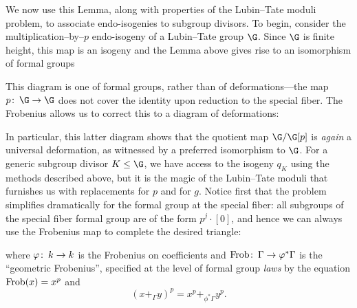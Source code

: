 We now use this Lemma, along with properties of the Lubin--Tate moduli problem, to associate endo-isogenies to subgroup divisors.  To begin, consider the multiplication--by--$p$ endo-isogeny of a Lubin--Tate group $\G$.  Since $\G$ is finite height, this map is an isogeny and the Lemma above gives rise to an isomorphism of formal groups
\begin{center}
\end{center}
This diagram is one of formal groups, rather than of deformations---the map $p\co \G \to \G$ does not cover the identity upon reduction to the special fiber.  The Frobenius allows us to correct this to a diagram of deformations:
\begin{center}
\end{center}
In particular, this latter diagram shows that the quotient map $\G / \G[p]$ is \emph{again} a universal deformation, as witnessed by a preferred isomorphism to $\G$.  For a generic subgroup divisor $K \le \G$, we have access to the isogeny $q_K$ using the methods described above, but it is the magic of the Lubin--Tate moduli that furnishes us with replacements for $p$ and for $g$.  Notice first that the problem simplifies dramatically for the formal group at the special fiber: all subgroups of the special fiber formal group are of the form $p^j \cdot [0]$, and hence we can always use the Frobenius map to complete the desired triangle:
\begin{center}
\end{center}
where $\varphi\colon\thinspace k \to k$ is the Frobenius on coefficients and $\operatorname{Frob}\colon\thinspace \Gamma \to \varphi^* \Gamma$ is the ``geometric Frobenius'', specified at the level of formal group \emph{laws} by the equation $\operatorname{Frob}(x) = x^p$ and \[(x +_\Gamma y)^p = x^p +_{\phi^* \Gamma} y^p.\]

